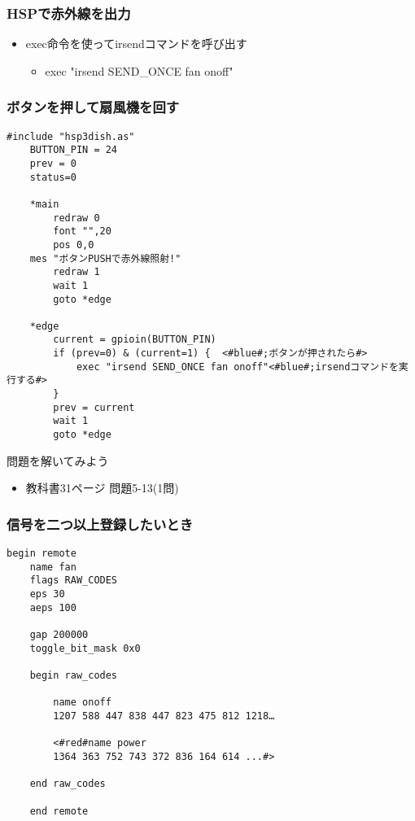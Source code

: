 \begin{frame}
    \frametitle{HSPで赤外線を出力}
    \begin{itemize}
        \item exec命令を使ってirsendコマンドを呼び出す
        \begin{itemize}
            \item exec "irsend SEND\_ONCE fan onoff" 
        \end{itemize}
    \end{itemize}
\end{frame}

\begin{frame}[fragile]
    \frametitle{ボタンを押して扇風機を回す}
    \begin{lstlisting}[title=\textasciitilde/05/ir.hsp]
    #include "hsp3dish.as"
    BUTTON_PIN = 24
    prev = 0
    status=0

    *main
        redraw 0 
        font "",20
        pos 0,0
    mes "ボタンPUSHで赤外線照射!"
        redraw 1
        wait 1
        goto *edge

    *edge
        current = gpioin(BUTTON_PIN)
        if (prev=0) & (current=1) {	 <#blue#;ボタンが押されたら#>
            exec "irsend SEND_ONCE fan onoff"<#blue#;irsendコマンドを実行する#>
        }
        prev = current
        wait 1
        goto *edge
    \end{lstlisting}
\end{frame}

\begin{frame}
    \begin{exampleblock}{問題を解いてみよう}
    \begin{itemize}
        \item 教科書31ページ 問題5-13(1問)
    \end{itemize}
    \end{exampleblock}
\end{frame}

\begin{frame}[fragile]
    \frametitle{信号を二つ以上登録したいとき}
    \begin{lstlisting}[title=２つの信号を登録するときのtemplate.lircd.comf,label=２つの信号を登録するときのtemplate.lircd.comf]
    begin remote
    name fan
    flags RAW_CODES
    eps 30
    aeps 100

    gap 200000
    toggle_bit_mask 0x0

    begin raw_codes

        name onoff
        1207 588 447 838 447 823 475 812 1218…

        <#red#name power
        1364 363 752 743 372 836 164 614 ...#>

    end raw_codes

    end remote
    \end{lstlisting}
\end{frame}

